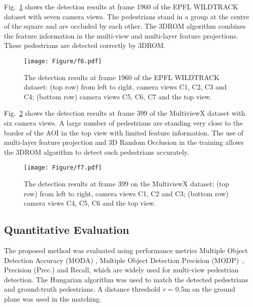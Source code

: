 \documentclass[runningheads]{llncs}
\begin{document}
	
	Fig.~\ref{f6} shows the detection results at frame 1960 of the EPFL WILDTRACK dataset with seven camera views. The pedestrians stand in a group at the centre of the square and are occluded by each other. The 3DROM algorithm combines the feature information in the multi-view and multi-layer feature projections. These pedestrians are detected correctly by 3DROM.
	\begin{figure}[t]
		\centering
		\texttt{[image: Figure/f6.pdf]}
		\caption{The detection results at frame 1960 of the EPFL WILDTRACK dataset: (top row) from left to right, camera views C1, C2, C3 and C4; (bottom row) camera views C5, C6, C7 and the top view.}
		\label{f6}
	\end{figure}
	
	Fig.~\ref{f7} shows the detection results at frame 399 of the MultiviewX dataset with six camera views. A large number of pedestrians are standing very close to the border of the AOI in the top view with limited feature information. The use of multi-layer feature projection and 3D Random Occlusion in the training allows the 3DROM algorithm to detect such pedestrians accurately.
	\begin{figure}[t]
		\centering
		\texttt{[image: Figure/f7.pdf]}
\caption{The detection results at frame 399 on the MultiviewX dataset: (top row) from left to right, camera views C1, C2 and C3; (bottom row) camera views C4, C5, C6 and the top view.
}
		\label{f7}
	\end{figure}
	
	\subsection{Quantitative Evaluation}
	The proposed method was evaluated using performance metrics Multiple Object Detection Accuracy (MODA) \cite{kasturi2008framework}, Multiple Object Detection Precision (MODP)~\cite{kasturi2008framework}, Precision (Prec.) and Recall, which are widely used for multi-view pedestrian detection.
The Hungarian algorithm was used to match the detected pedestrians and ground-truth pedestrians. A distance threshold \textit{r} = 0.5m on the ground plane was used in the matching.
	
\end{document}
